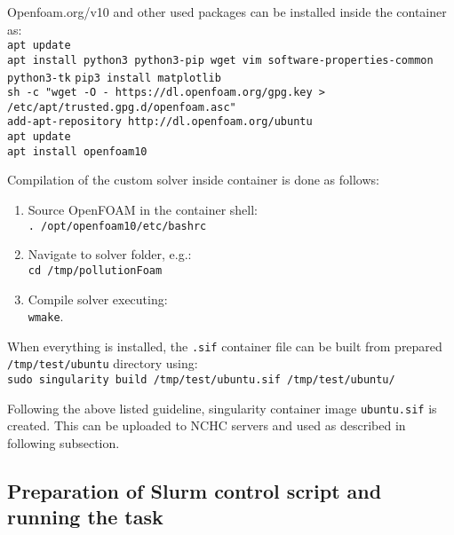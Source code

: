 Openfoam.org/v10 and other used packages can be installed inside the container as:\\[0.2cm]
    \indent\quad\quad\texttt{apt update}\\[0.2cm]
    \indent\quad\quad\texttt{apt install python3 python3-pip wget vim software-properties-common \\ \indent\quad\quad\quad\quad python3-tk}
    \indent\quad\quad\texttt{pip3 install matplotlib}\\[0.2cm]
    \indent\quad\quad\texttt{sh -c "wget -O - https://dl.openfoam.org/gpg.key >} \\ \indent\quad\quad\quad\quad\texttt{/etc/apt/trusted.gpg.d/openfoam.asc"}\\[0.2cm]
    \indent\quad\quad\texttt{add-apt-repository http://dl.openfoam.org/ubuntu}\\[0.2cm]
    \indent\quad\quad\texttt{apt update}\\[0.2cm]
    \indent\quad\quad\texttt{apt install openfoam10}

Compilation of the custom solver inside container is done as follows:
\begin{enumerate}
    \item Source OpenFOAM in the container shell:\\[0.2cm] 
    \indent\quad\quad\texttt{. /opt/openfoam10/etc/bashrc}
    \item Navigate to solver folder, e.g.:\\[0.2cm] 
    \indent\quad\quad\texttt{cd /tmp/pollutionFoam} 
    \item Compile solver executing: \\[0.2cm] 
    \indent\quad\quad\texttt{wmake}.
\end{enumerate}

When everything is installed, the \texttt{.sif} container file can be built from prepared \texttt{/tmp/test/ubuntu} directory using:\\[0.2cm] 
\indent\quad\quad\texttt{sudo singularity build /tmp/test/ubuntu.sif /tmp/test/ubuntu/}


Following the above listed guideline, singularity container image \texttt{ubuntu.sif} is created. This can be uploaded to NCHC servers and used as described in following subsection. 

\subsection{Preparation of Slurm control script and running the task}
\label{subsec:slurmCtrl}

